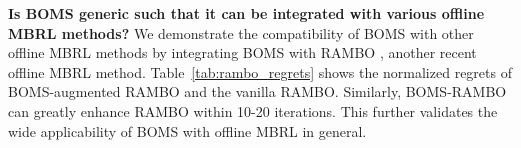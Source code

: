 







\vspace{1mm}
\noindent\textbf{{Is BOMS generic such that it can be integrated with various offline MBRL methods?}}
We demonstrate the compatibility of BOMS with other offline MBRL methods by integrating BOMS with RAMBO \citep{rigter2022rambo}, another recent offline MBRL method.
Table~\ref{tab:rambo_regrets} shows the normalized regrets of BOMS-augmented RAMBO and the vanilla RAMBO. 
Similarly, BOMS-RAMBO can greatly enhance RAMBO within 10-20 iterations. This further validates the wide applicability of BOMS with offline MBRL in general. 




